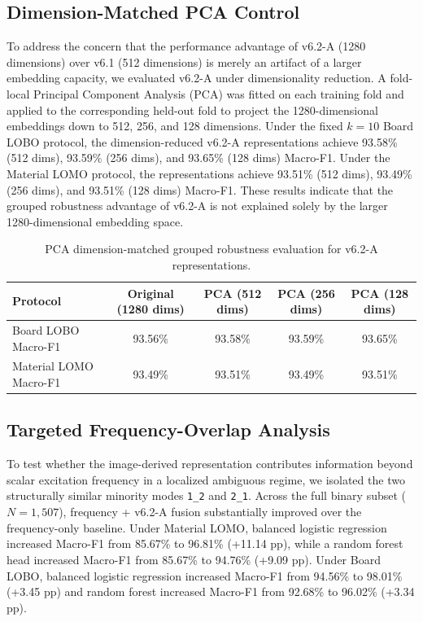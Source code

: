 \documentclass[review,3p,times]{elsarticle}
\begin{document}
\subsection{Dimension-Matched PCA Control}
To address the concern that the performance advantage of v6.2-A (1280 dimensions) over v6.1 (512 dimensions) is merely an artifact of a larger embedding capacity, we evaluated v6.2-A under dimensionality reduction. A fold-local Principal Component Analysis (PCA) was fitted on each training fold and applied to the corresponding held-out fold to project the 1280-dimensional embeddings down to 512, 256, and 128 dimensions. Under the fixed $k=10$ Board LOBO protocol, the dimension-reduced v6.2-A representations achieve 93.58\% (512 dims), 93.59\% (256 dims), and 93.65\% (128 dims) Macro-F1. Under the Material LOMO protocol, the representations achieve 93.51\% (512 dims), 93.49\% (256 dims), and 93.51\% (128 dims) Macro-F1. These results indicate that the grouped robustness advantage of v6.2-A is not explained solely by the larger 1280-dimensional embedding space.

\begin{table}[htbp]
\centering
\caption{PCA dimension-matched grouped robustness evaluation for v6.2-A representations.}
\label{tab:pca_dimensions}
\begin{tabular}{lcccc}
\toprule
\textbf{Protocol} & \textbf{Original (1280 dims)} & \textbf{PCA (512 dims)} & \textbf{PCA (256 dims)} & \textbf{PCA (128 dims)} \\
\midrule
Board LOBO Macro-F1 & 93.56\% & 93.58\% & 93.59\% & 93.65\% \\
Material LOMO Macro-F1 & 93.49\% & 93.51\% & 93.49\% & 93.51\% \\
\bottomrule
\end{tabular}
\end{table}

\subsection{Targeted Frequency-Overlap Analysis}
To test whether the image-derived representation contributes information beyond scalar excitation frequency in a localized ambiguous regime, we isolated the two structurally similar minority modes \texttt{1\_2} and \texttt{2\_1}. Across the full binary subset ($N=1{,}507$), frequency + v6.2-A fusion substantially improved over the frequency-only baseline. Under Material LOMO, balanced logistic regression increased Macro-F1 from 85.67\% to 96.81\% (+11.14 pp), while a random forest head increased Macro-F1 from 85.67\% to 94.76\% (+9.09 pp). Under Board LOBO, balanced logistic regression increased Macro-F1 from 94.56\% to 98.01\% (+3.45 pp) and random forest increased Macro-F1 from 92.68\% to 96.02\% (+3.34 pp).
\end{document}
